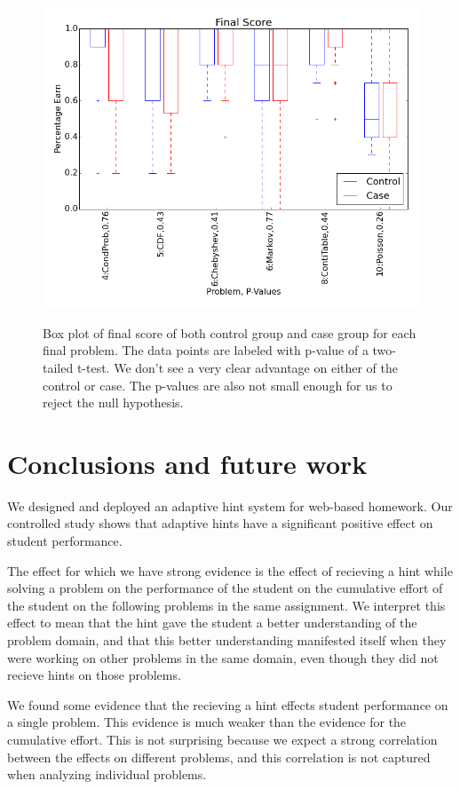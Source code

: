 \documentclass{llncs2e/llncs}
\begin{document}
\begin{figure}[h]
\centering
\caption{Box plot of final score of both control group and case group for each final problem. The data points are labeled with p-value of a two-tailed t-test. We don't see a very clear advantage on either of the control or case. The p-values are also not small enough for us to reject the null hypothesis.}
\includegraphics[width=0.9\linewidth]{image/final_boxPlot.png}
\label{fig:final_compare_all}
\end{figure}
\fi


\section{Conclusions and future work}

We designed and deployed an adaptive hint system for web-based
homework. Our controlled study shows that adaptive hints have a
significant positive effect on student performance.

The effect for which we have strong evidence is the effect of
recieving a hint while solving a problem on the performance of the
student on the cumulative effort of the student on the following
problems in the same assignment. We interpret this effect to mean that
the hint gave the student a better understanding of the problem
domain, and that this better understanding manifested itself when they
were working on other problems in the same domain, even though they
did not recieve hints on those problems.

We found some evidence that the recieving a hint effects student
performance on a single problem. This evidence is much weaker than the
evidence for the cumulative effort. This is not surprising because we
expect a strong correlation between the effects on different problems,
and this correlation is not captured when analyzing individual
problems.
\end{document}
